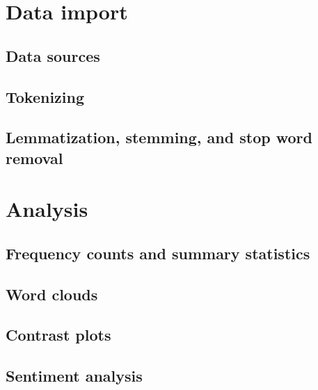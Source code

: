 \documentclass[
]{book}
\begin{document}
\hypertarget{data-import}{%
\section{Data import}\label{data-import}}

\hypertarget{data-sources}{%
\subsection{Data sources}\label{data-sources}}

\hypertarget{tokenizing}{%
\subsection{Tokenizing}\label{tokenizing}}

\hypertarget{lemmatization-stemming-and-stop-word-removal}{%
\subsection{Lemmatization, stemming, and stop word removal}\label{lemmatization-stemming-and-stop-word-removal}}

\hypertarget{analysis}{%
\section{Analysis}\label{analysis}}

\hypertarget{frequency-counts-and-summary-statistics}{%
\subsection{Frequency counts and summary statistics}\label{frequency-counts-and-summary-statistics}}

\hypertarget{word-clouds}{%
\subsection{Word clouds}\label{word-clouds}}

\hypertarget{contrast-plots}{%
\subsection{Contrast plots}\label{contrast-plots}}

\hypertarget{sentiment-analysis}{%
\subsection{Sentiment analysis}\label{sentiment-analysis}}
\end{document}

